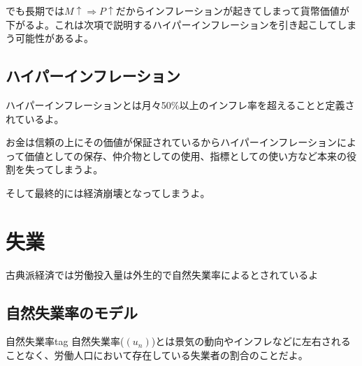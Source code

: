 \documentclass[a4paper, 12pt]{article}
\begin{document}
でも長期では$M \uparrow \Rightarrow P \uparrow$だからインフレーションが起きてしまって貨幣価値が下がるよ。これは次項で説明するハイパーインフレーションを引き起こしてしまう可能性があるよ。
\subsection{ハイパーインフレーション}
ハイパーインフレーションとは月々50\%以上のインフレ率を超えることと定義されているよ。

お金は信頼の上にその価値が保証されているからハイパーインフレーションによって価値としての保存、仲介物としての使用、指標としての使い方など本来の役割を失ってしまうよ。

そして最終的には経済崩壊となってしまうよ。

\newpage

\section{失業}
古典派経済では労働投入量は外生的で自然失業率によるとされているよ

\subsection{自然失業率のモデル}
\begin{definition1}{自然失業率}{tag}
自然失業率($(u_n)$)とは景気の動向やインフレなどに左右されることなく、労働人口において存在している失業者の割合のことだよ。
\end{definition1}
\end{document}
